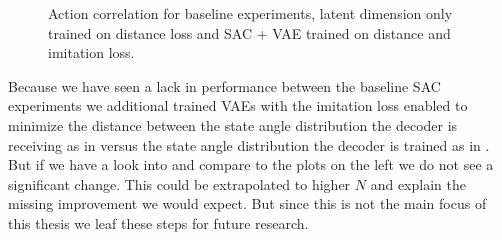 \begin{figure}[h]
    \begin{center}
        \hfill
    \end{center}
    \caption[action correlation comparison]{Action correlation for baseline experiments, latent dimension only trained on distance loss and SAC + VAE trained on distance and imitation loss. }
    \label{fig:SAC_action_correlation_comp}
\end{figure}

Because we have seen a lack in performance between the baseline SAC experiments we additional trained VAEs with the imitation loss enabled to minimize the distance between the state angle distribution the decoder is receiving as in  versus the state angle distribution the decoder is trained as in . But if we have a look into  and compare to the plots on the left we do not see a significant change. This could be extrapolated to higher $N$ and explain the missing improvement we would expect. But since this is not the main focus of this thesis we leaf these steps for future research.

